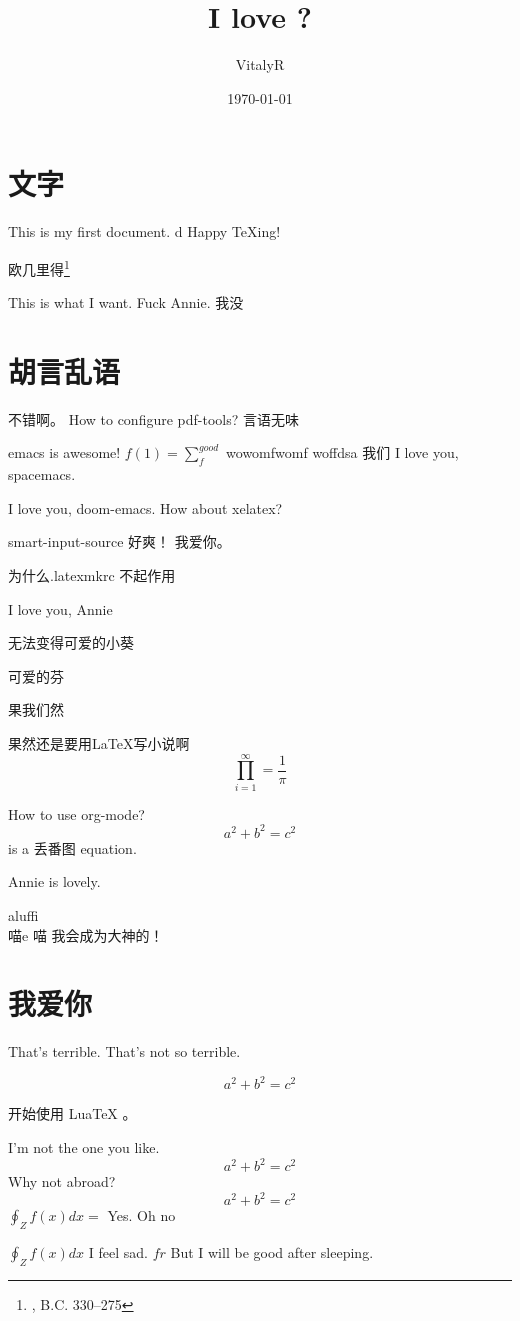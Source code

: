 \documentclass[UTF8]{ctexart}
\title{I love ?}
\author{VitalyR}
\date{\today}
\begin{document}
\maketitle
\tableofcontents

\section{文字}
This is my first document.
d
Happy \TeX ing!

欧几里得\footnote{, B.C. 330--275}

This is what I want.
Fuck Annie.
我没

\section{胡言乱语}

不错啊。
How to configure pdf-tools?
言语无味

emacs is awesome!
\(f(1)=\sum_{f}^{good}\)
wowomfwomf woffdsa
我们
I love you, spacemacs.

I love you, doom-emacs.
How about xelatex?


smart-input-source 好爽！
我爱你。

为什么.latexmkrc 不起作用

I love you, Annie

无法变得可爱的小葵

可爱的芬

果我们然

果然还是要用\LaTeX 写小说啊
\begin{equation}
	\prod_{i=1}^{\infty}=\frac{1}{\pi}
\end{equation}

How to use org-mode?
\[a^{2}+b^{2}=c^{2}\] is a 丢番图 equation.

Annie is lovely.

aluffi \\
喵e
喵
我会成为大神的！

\section{我爱你}

That's terrible.
That's not so terrible.

\begin{equation}
	\label{eq:2}
	a^{2}+b^{2}=c^{2}
\end{equation}

开始使用 LuaTeX 。

I'm not the one you like.
\[a^{2}+b^{2}=c^{2}\]
Why not abroad?
\[a^{2}+b^{2}=c^{2}\] \(\oint_{Z}f(x)dx = \) Yes.
Oh
no

\(\oint_{Z}f(x)dx\)
I feel sad.
\(fr\)
But I will be good after sleeping.
\end{document}

